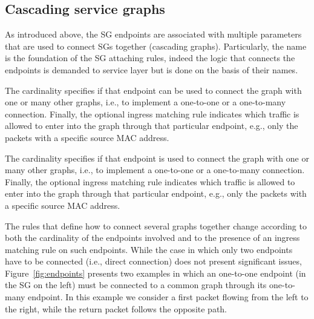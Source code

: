 \subsection{Cascading service graphs}
\label{sec:ep_cascade}

As introduced above, the SG endpoints are associated with multiple parameters that are used to connect SGs together (cascading graphs). 
Particularly, the name is the foundation of the SG attaching rules, indeed  %
the logic that connects the endpoints is demanded to service layer but is done on the basis of their names.

The cardinality specifies if that endpoint can be used to connect the graph with one or many other graphs, i.e., to implement a one-to-one or a one-to-many connection. Finally, the optional ingress matching rule indicates which traffic is allowed to enter into the graph through that particular endpoint, e.g., only the packets with a specific source MAC address.

The cardinality specifies if that endpoint is used to connect the graph with one or many other graphs, i.e., to implement a one-to-one or a one-to-many connection. Finally, the optional ingress matching rule indicates which traffic is allowed to enter into the graph through that particular endpoint, e.g., only the packets with a specific source MAC address.

The rules that define how to connect several graphs together change according to both the cardinality of the endpoints involved and to the presence of an ingress matching rule on such endpoints. While the case in which only two endpoints have to be connected (i.e., direct connection) does not present significant issues, Figure~\ref{fig:endpoints} presents two examples in which an one-to-one endpoint (in the SG on the left) must be connected to a common graph through its one-to-many endpoint. In this example we consider a first packet flowing from the left to the right, while the return packet follows the opposite path.

